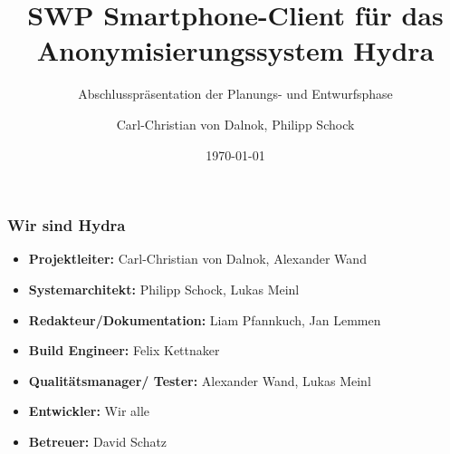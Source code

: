 \documentclass[t]{beamer}
\title[SWP Hydra-Client]{SWP Smartphone-Client für das Anonymisierungssystem Hydra}
\subtitle{Abschlusspräsentation der Planungs- und Entwurfsphase}
\author{Carl-Christian von Dalnok, Philipp Schock}
\date{\today}
\begin{document}
    \begin{frame}
        \titlepage
    \end{frame}

    \begin{frame}
    	\frametitle{Wir sind Hydra}
    	\begin{itemize}
    		
    		\item \textbf{Projektleiter:} Carl-Christian von Dalnok, Alexander Wand
    		
    		\item \textbf{Systemarchitekt:} Philipp Schock, Lukas Meinl
    		
    		\item \textbf{Redakteur/Dokumentation:} Liam Pfannkuch, Jan Lemmen
    		
    		\item \textbf{Build Engineer:}  Felix Kettnaker
    		
    		
    		\item \textbf{Qualitätsmanager/ Tester:} Alexander Wand, Lukas Meinl
    		\item \textbf{Entwickler:} Wir alle
    		\linebreak[2]
    		\item \textbf{Betreuer:} David Schatz
    	\end{itemize}
    	
    \end{frame}
\end{document}
